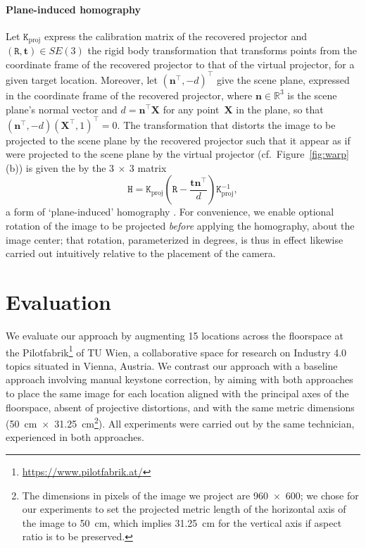 \documentclass[review]{elsarticle}
\begin{document}
\paragraph{Plane-induced homography} Let $\mathtt{K}_\text{proj}$ express the calibration matrix of the recovered projector and $(\mathtt{R}, \mathbf{t}) \in SE(3)$ the rigid body transformation that transforms points from the coordinate frame of the recovered projector to that of the virtual projector, for a given target location. Moreover, let $(\mathbf{n}^\top, -d)^\top$ give the scene plane, expressed in the coordinate frame of the recovered projector, where $\mathbf{n} \in \mathbb{R}^3$ is the scene plane's normal vector and $d = \mathbf{n}^\top\mathbf{X}$ for any point~$\mathbf{X}$ in the plane, so that $(\mathbf{n}^\top, -d) (\mathbf{X}^\top, 1)^\top = 0$. The transformation that distorts the image to be projected to the scene plane by the recovered projector such that it appear as if were projected to the scene plane by the virtual projector (cf.\ Figure~\ref{fig:warp}(b)) is given the by the $3~\times~3$ matrix
\begin{equation}
\mathtt{H} = \mathtt{K}_\text{proj}\left(\mathtt{R} - \frac{\mathbf{t}\mathbf{n}^\top}{d}\right)\mathtt{K}_\text{proj}^{-1},
\label{homgen}
\end{equation}
a form of `plane-induced' homography \cite{Hartley2004}. For convenience, we enable optional rotation of the image to be projected \textit{before} applying the homography, about the image center; that rotation, parameterized in degrees, is thus in effect likewise carried out intuitively relative to the placement of the camera.

\section{Evaluation}

We evaluate our approach by augmenting 15 locations across the floorspace at the Pilotfabrik\footnote{\url{https://www.pilotfabrik.at/}} of TU Wien, a collaborative space for research on Industry 4.0 topics situated in Vienna, Austria. We contrast our approach with a baseline approach involving manual keystone correction, by aiming with both approaches to place the same image for each location aligned with the principal axes of the floorspace, absent of projective distortions, and with the same metric dimensions (50~cm~$\times$~31.25~cm\footnote{The dimensions in pixels of the image we project are 960~$\times$~600; we chose for our experiments to set the projected metric length of the horizontal axis of the image to 50~cm, which implies 31.25~cm for the vertical axis if aspect ratio is to be preserved.}). All experiments were carried out by the same technician, experienced in both approaches.
\end{document}
